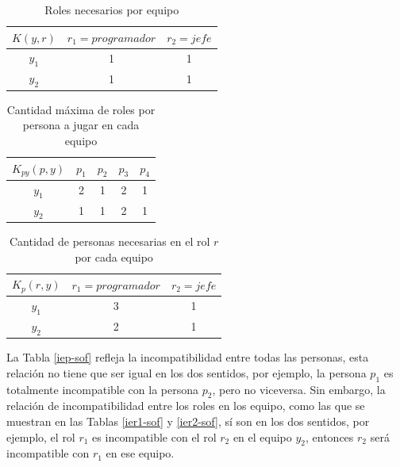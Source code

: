 \begin{table}[H]
  \centering
  \caption{Roles necesarios por equipo}\label{crp-sof}
\begin{tabular}{|c|c|c|}
  \hline
  $K(y,r)$ & $r_1=programador$ & $r_2=jefe$  \\ \hline
  $y_1$ & 1 & 1   \\ \hline
  $y_2$ & 1 & 1   \\ \hline
\end{tabular}
\end{table}


\begin{table}[H]
	\centering
	\caption{Cantidad máxima de roles por persona a jugar en cada equipo }\label{cmrpp-sof}
	\begin{tabular}{|c|c|c|c|c|}
		\hline
		$K_{py}(p,y)$ & $p_1$ & $p_2$ & $p_3$  & $p_4$  \\ \hline
		$y_1$ 		  &   2	  &    1  &	   2   &    1  \\ \hline
		$y_2$ 		  &   1   &    1  &    2   &    1  \\
		\hline
	\end{tabular}
\end{table}


\begin{table}[H]
	\centering
	\caption{Cantidad de personas necesarias en el rol $r$ por cada equipo}\label{cpnr-sof}
	\begin{tabular}{|c|c|c|}
		\hline
		 $K_{p}(r, y)$ & $r_1=programador$ & $r_2=jefe$  \\ \hline
			$y_1$	   & 		3	 	&		1 		 \\ \hline
			$y_2$	   & 		2	 	&		1   	 \\ \hline
	\end{tabular}
\end{table}


La Tabla \ref{iep-sof} refleja la incompatibilidad entre todas las personas, esta relación no tiene que ser igual en los dos sentidos, por ejemplo, la persona $p_1$ es totalmente incompatible con la persona $p_2$, pero no viceversa. Sin embargo, la relación de incompatibilidad entre los roles en los equipo, como las que se muestran en las Tablas \ref{ier1-sof} y \ref{ier2-sof}, sí son en los dos sentidos, por ejemplo, el rol $r_1$ es incompatible con el rol $r_2$ en el equipo $y_2$, entonces $r_2$ será incompatible con $r_1$ en ese equipo.

